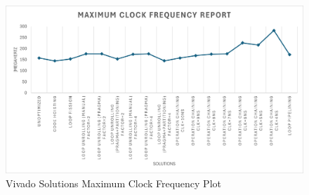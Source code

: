 \begin{figure}[H]
	\centering
	\includegraphics[width=0.7\textheight]{conclusions/frequency.png}
	\caption{Vivado Solutions Maximum Clock Frequency Plot}
	\label{fig:vivado-maximum-clock-frequency-plot}
\end{figure}